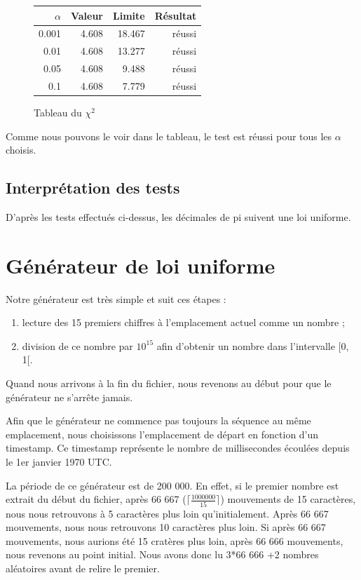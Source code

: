 \documentclass[10pt,a4paper]{article}
\begin{document}
	\begin{figure}[h]
		\centering
		\begin{tabular}{|r|r|r|r|}
			\hline
			$\alpha$ & Valeur & Limite & Résultat\\
			\hline
			0.001 & 4.608 & 18.467 & réussi\\
			0.01 & 4.608 & 13.277 & réussi\\
			0.05 & 4.608 & 9.488 & réussi\\
			0.1 & 4.608 & 7.779 & réussi\\
			\hline
		\end{tabular}
		\caption{Tableau du $\chi^2$}
	\end{figure}
	
	Comme nous pouvons le voir dans le tableau, le test est réussi pour tous les $\alpha$ choisis.
	
	\newpage
	\subsection{Interprétation des tests}
	D'après les tests effectués ci-dessus, les décimales de pi suivent une loi uniforme.
	
	\newpage
	\section{Générateur de loi uniforme}
	Notre générateur est très simple et suit ces étapes :
	\begin{enumerate}
		\item lecture des 15 premiers chiffres à l'emplacement actuel comme un nombre ;
		\item division de ce nombre par $10^{15}$ afin d'obtenir un nombre dans l'intervalle [0, 1[.
	\end{enumerate}
	Quand nous arrivons à la fin du fichier, nous revenons au début pour que le générateur ne s'arrête jamais.
	
	Afin que le générateur ne commence pas toujours la séquence au même emplacement, nous choisissons l'emplacement de départ en fonction d'un timestamp. Ce timestamp représente le nombre de millisecondes écoulées depuis le 1er janvier 1970 UTC.
	
	La période de ce générateur est de 200 000. En effet, si le premier nombre est extrait du début du fichier, après 66 667 ($\lceil\frac{1 000 000}{15}\rceil$) mouvements de 15 caractères, nous nous retrouvons à 5 caractères plus loin qu'initialement. Après 66 667 mouvements, nous nous retrouvons 10 caractères plus loin. Si après 66 667 mouvements, nous aurions été 15 cratères plus loin, après 66 666 mouvements, nous revenons au point initial. Nous avons donc lu 3*66 666 +2 nombres aléatoires avant de relire le premier.
	
\end{document}
